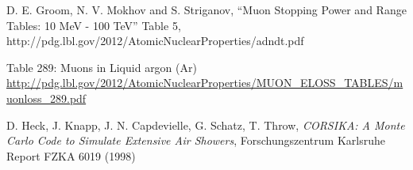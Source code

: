 \documentclass[a4paper,11pt]{article}
\begin{document}
\begin{thebibliography}{99}
  D. E. Groom, N. V. Mokhov and S. Striganov, ``Muon Stopping Power and Range Tables: 10 MeV - 100 TeV'' Table 5,
  http://pdg.lbl.gov/2012/AtomicNuclearProperties/adndt.pdf


   Table 289: Muons in Liquid argon (Ar) \url{http://pdg.lbl.gov/2012/AtomicNuclearProperties/MUON_ELOSS_TABLES/muonloss_289.pdf}


   D. Heck, J. Knapp, J. N. Capdevielle, G. Schatz, T. Throw, \emph{CORSIKA: A Monte Carlo Code to Simulate Extensive Air Showers}, Forschungszentrum Karlsruhe Report FZKA 6019 (1998)









\end{thebibliography}
\end{document}
